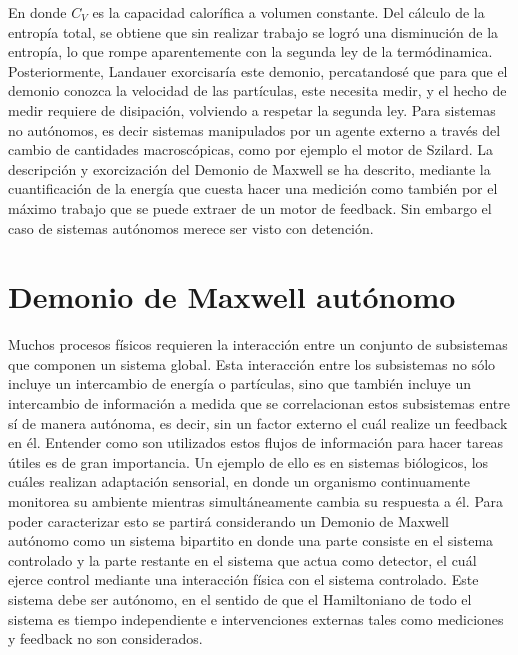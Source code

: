 En donde $C_{V}$ es la capacidad calorífica a volumen constante. Del cálculo de la entropía total, se obtiene que sin realizar trabajo se logró una disminución de la entropía, lo que rompe aparentemente con la segunda ley de la termódinamica. Posteriormente, Landauer exorcisaría este demonio, percatandosé que para que el demonio conozca la velocidad de las partículas, este necesita medir, y el hecho de medir requiere de  disipación, volviendo a respetar la segunda ley\cite{Landauer_1961}. Para sistemas no autónomos, es decir sistemas manipulados por un agente externo a través del cambio de cantidades macroscópicas, como por ejemplo el motor de Szilard\cite{szilard1964decrease}. La descripción y exorcización del Demonio de Maxwell se ha descrito, mediante la cuantificación de la energía que cuesta hacer una medición como también por el máximo trabajo que se puede extraer de un motor de feedback\cite{maruyama2009colloquium,sagawa2008second}. Sin embargo el caso de sistemas autónomos merece ser visto con detención.


\section{Demonio de Maxwell autónomo}
Muchos procesos físicos requieren la interacción entre un conjunto de subsistemas que componen un sistema global. Esta interacción entre los subsistemas no sólo incluye un intercambio de energía o partículas, sino que también incluye un intercambio de información a medida que se correlacionan estos subsistemas entre sí de manera autónoma, es decir, sin un factor externo el cuál realize un feedback en él. Entender como son utilizados estos flujos de información para hacer tareas útiles es de gran importancia. Un ejemplo de ello es en sistemas biólogicos, los cuáles realizan adaptación sensorial, en donde un organismo continuamente monitorea su ambiente mientras simultáneamente cambia su respuesta a él\cite{lan2012energy}. Para poder caracterizar esto se partirá considerando un Demonio de Maxwell autónomo como un sistema bipartito en donde una parte consiste en el sistema controlado y la parte restante en el sistema que actua como detector, el cuál ejerce control mediante una interacción física con el sistema controlado. Este sistema debe ser autónomo, en el sentido de que el Hamiltoniano de todo el sistema es tiempo independiente e intervenciones externas tales como mediciones y feedback no son considerados.

